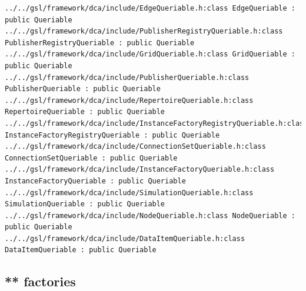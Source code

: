 \begin{verbatim}
../../gsl/framework/dca/include/EdgeQueriable.h:class EdgeQueriable : public Queriable                                                                                                                         
../../gsl/framework/dca/include/PublisherRegistryQueriable.h:class PublisherRegistryQueriable : public Queriable                                                                                               
../../gsl/framework/dca/include/GridQueriable.h:class GridQueriable : public Queriable                                                                                                                         
../../gsl/framework/dca/include/PublisherQueriable.h:class PublisherQueriable : public Queriable                                                                                                               
../../gsl/framework/dca/include/RepertoireQueriable.h:class RepertoireQueriable : public Queriable                                                                                                             
../../gsl/framework/dca/include/InstanceFactoryRegistryQueriable.h:class InstanceFactoryRegistryQueriable : public Queriable                                                                                   
../../gsl/framework/dca/include/ConnectionSetQueriable.h:class ConnectionSetQueriable : public Queriable                                                                                                       
../../gsl/framework/dca/include/InstanceFactoryQueriable.h:class InstanceFactoryQueriable : public Queriable                                                                                                   
../../gsl/framework/dca/include/SimulationQueriable.h:class SimulationQueriable : public Queriable                                                                                                             
../../gsl/framework/dca/include/NodeQueriable.h:class NodeQueriable : public Queriable                                                                                                                         
../../gsl/framework/dca/include/DataItemQueriable.h:class DataItemQueriable : public Queriable    
\end{verbatim}




\subsection{ ** factories}

